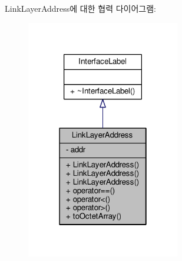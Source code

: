 Link\+Layer\+Address에 대한 협력 다이어그램\+:
\nopagebreak
\begin{figure}[H]
\begin{center}
\leavevmode
\includegraphics[width=190pt]{class_link_layer_address__coll__graph}
\end{center}
\end{figure}
